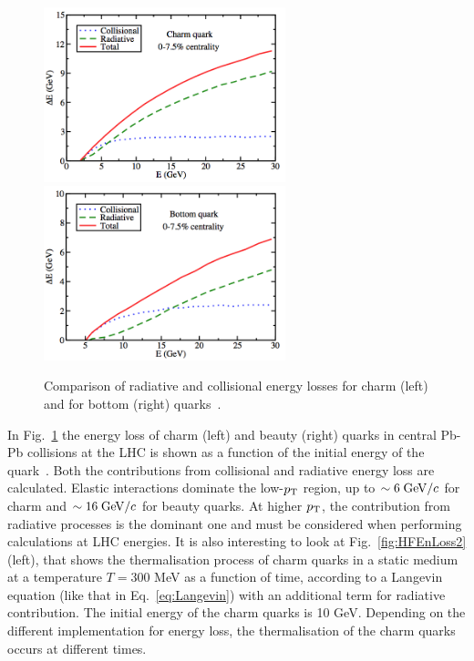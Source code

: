 \begin{figure}[!ht]
  \centering
  \includegraphics[width=7cm]{FigCap2/HFEnLoss1.png}
  \includegraphics[width=7cm]{FigCap2/HFEnLoss2.png}
  \caption{Comparison of radiative and collisional energy losses for charm (left) and for bottom (right) quarks~\cite{Cao:2013ita}.}
  \label{fig:HFEnLoss}
\end{figure}
In Fig.~\ref{fig:HFEnLoss} the energy loss of charm (left) and beauty (right) quarks 
in central Pb-Pb collisions at the LHC is shown as a function of the initial energy of the quark~\cite{Cao:2013ita}.
Both the contributions from collisional and radiative energy loss are calculated. Elastic interactions
dominate the low-$p_{\rm T}$ region, up to $\sim 6\; \mathrm{GeV}/c$ for charm and $\sim 16 \;\mathrm{GeV}/c$ for beauty quarks.
At higher $p_{\rm T}$, the contribution from radiative processes is the dominant one and must be considered when 
performing calculations at LHC energies.
It is also interesting to look at Fig.~\ref{fig:HFEnLoss2} (left), that shows the 
thermalisation process of charm quarks in a static medium at a temperature
$T = 300$ MeV as a function of time, according to a Langevin equation (like that in Eq.~\ref{eq:Langevin}) with 
an additional term for radiative contribution. 
The initial energy of the charm quarks is 10 GeV. Depending on the different implementation for energy
loss, the thermalisation of the charm quarks occurs at different times.\\
